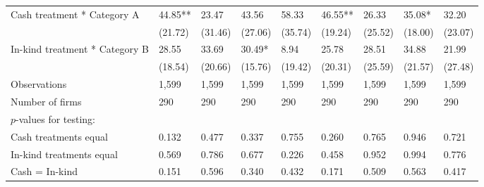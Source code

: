 \begin{table}[H]
{\begin{tabular}{lllllllll}
\hspace{1em}Cash treatment * Category A & 44.85** & 23.47 & 43.56 & 58.33 & 46.55** & 26.33 & 35.08* & 32.20\\
\hspace{1em} & (21.72) & (31.46) & (27.06) & (35.74) & (19.24) & (25.52) & (18.00) & (23.07)\\
\hspace{1em}In-kind treatment * Category B & 28.55 & 33.69 & 30.49* & 8.94 & 25.78 & 28.51 & 34.88 & 21.99\\
\hspace{1em} & (18.54) & (20.66) & (15.76) & (19.42) & (20.31) & (25.59) & (21.57) & (27.48)\\
\hspace{1em}Observations & 1,599 & 1,599 & 1,599 & 1,599 & 1,599 & 1,599 & 1,599 & 1,599\\
\hspace{1em}Number of firms & 290 & 290 & 290 & 290 & 290 & 290 & 290 & 290\\
\hspace{1em}$p$-values for testing: &  &  &  &  &  &  &  & \\
\hspace{1em}\hspace{1em} Cash treatments equal & 0.132 & 0.477 & 0.337 & 0.755 & 0.260 & 0.765 & 0.946 & 0.721\\
\hspace{1em}\hspace{1em} In-kind treatments equal & 0.569 & 0.786 & 0.677 & 0.226 & 0.458 & 0.952 & 0.994 & 0.776\\
\hspace{1em}\hspace{1em} Cash = In-kind & 0.151 & 0.596 & 0.340 & 0.432 & 0.171 & 0.509 & 0.563 & 0.417\\
\bottomrule
\end{tabular}}
\end{table}
